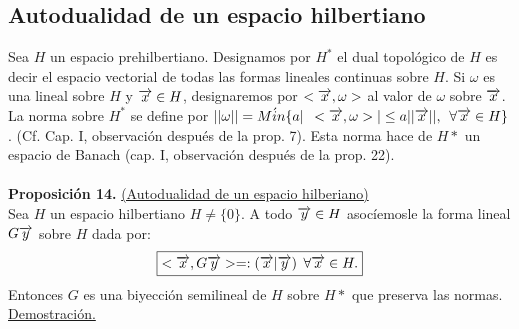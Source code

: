 \subsection{Autodualidad de un espacio hilbertiano}
Sea $H$ un espacio prehilbertiano. Designamos por $H^*$ el dual topológico de $H$ es decir el espacio vectorial de todas las formas lineales continuas sobre $H$. Si $\omega$ es una lineal sobre $H$ y $\overrightarrow{x} \in H$, designaremos por $< \overrightarrow{x}, \omega>$ al valor de $\omega$ sobre $\overrightarrow{x}$. La norma sobre $H^*$ se define por $|| \omega ||=M\acute{i}n\lbrace a | \phantom{s} <\overrightarrow{x}, \omega > | \leq a || \overrightarrow{x}||, \phantom{s} \forall \overrightarrow{x} \in H \rbrace$. (Cf. Cap. I, observación después de la prop. 7). Esta norma hace de $H*$ un espacio de Banach (cap. I, observación después de la prop. 22).  \\ \\
\textbf{Proposición 14.} \underline{(Autodualidad de un espacio hilberiano)} \\
Sea $H$ un espacio hilbertiano $H\neq \lbrace 0 \rbrace$. A todo $\overrightarrow{y} \in H$ asocíemosle la forma lineal $G\overrightarrow{y}$ sobre $H$ dada por: 
\begin{equation*}
\boxed{<\overrightarrow{x},G\overrightarrow{y} >=: (\overrightarrow{x} | \overrightarrow{y}) \phantom{s} \forall \overrightarrow{x} \in H.}
\end{equation*}
Entonces $G$ es una biyección semilineal de $H$ sobre $H*$ que preserva las normas. \\
\underline{Demostración.} \\
